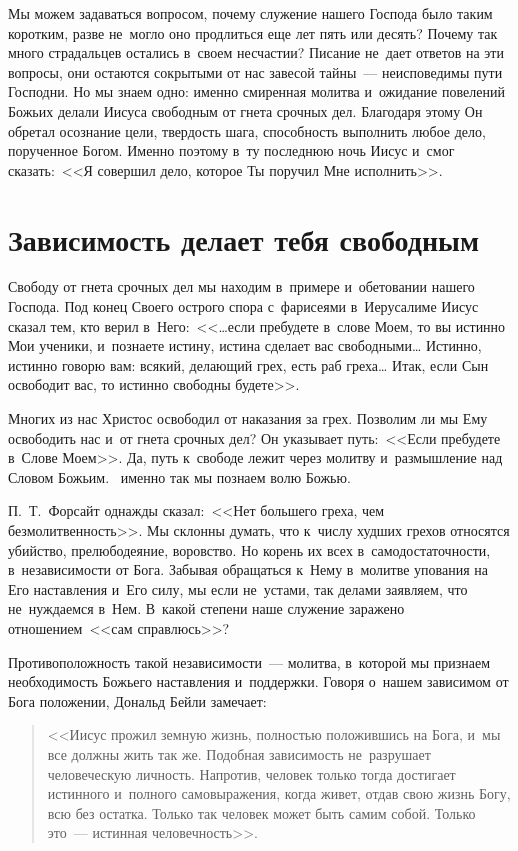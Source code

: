 \documentclass[12pt,article,a4paper,fittopage]{ncc}
\begin{document}
\begin{multicols}{2}
Мы можем задаваться вопросом, почему служение нашего Господа было таким коротким, разве не~могло оно продлиться еще лет пять или десять? Почему так много страдальцев остались в~своем несчастии? Писание не~дает ответов на эти вопросы, они остаются сокрытыми от нас завесой тайны~--- неисповедимы пути Господни. Но мы знаем одно: именно смиренная молитва и~ожидание повелений Божьих делали Иисуса свободным от гнета срочных дел. Благодаря этому Он обретал осознание цели, твердость шага, способность выполнить любое дело, порученное Богом. Именно поэтому в~ту последнюю ночь Иисус и~смог сказать:\ <<Я совершил дело, которое Ты поручил Мне исполнить>>.

\section*{Зависимость делает тебя свободным}

Свободу от гнета срочных дел мы находим в~примере и~обетовании нашего Господа. Под конец Своего острого спора с~фарисеями в~Иерусалиме Иисус сказал тем, кто верил в~Него:\ <<\ldots{}если пребудете в~слове Моем, то вы истинно Мои ученики, и~познаете истину, истина сделает вас свободными\ldots{} Истинно, истинно говорю вам: всякий, делающий грех, есть раб греха\ldots{} Итак, если Сын освободит вас, то истинно свободны будете>>.

Многих из нас Христос освободил от наказания за грех. Позволим ли мы Ему освободить нас и~от гнета срочных дел? Он указывает путь:\ <<Если пребудете в~Слове Моем>>. Да, путь к~свободе лежит через молитву и~размышление над Словом Божьим. ~именно так мы познаем волю Божью.

\pagestyle{lheadings}

П.~Т.~Форсайт однажды сказал:\ <<Нет большего греха, чем безмолитвенность>>. Мы склонны думать, что к~числу худших грехов относятся убийство, прелюбодеяние, воровство. Но корень их всех в~самодостаточности, в~независимости от Бога. Забывая обращаться к~Нему в~молитве упования на Его наставления и~Его силу, мы если не~устами, так делами заявляем, что не~нуждаемся в~Нем. В~какой степени наше служение заражено отношением\ <<сам справлюсь>>?

Противоположность такой независимости~--- молитва, в~которой мы признаем необходимость Божьего наставления и~поддержки. Говоря о~нашем зависимом от Бога положении, Дональд Бейли замечает:

\begin{quote}
<<Иисус прожил земную жизнь, полностью положившись на Бога, и~мы все должны жить так же. Подобная зависимость не~разрушает человеческую личность. Напротив, человек только тогда достигает истинного и~полного самовыражения, когда живет, отдав свою жизнь Богу, всю без остатка. Только так человек может быть самим собой. Только это~--- истинная человечность>>.
\end{quote}


\end{multicols}
\end{document}
